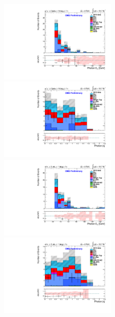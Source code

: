 \begin{figure}
\includegraphics[width=0.5\textwidth]{Plots/ControlPlots/TTbarPhotonAnalysis/MuMu/Photons/SignalPhotons/Photon_ET_splitTTbar_ratio.pdf}
\includegraphics[width=0.5\textwidth]{Plots/ControlPlots/TTbarPhotonAnalysis/MuMu/Photons/SignalPhotons/Photon_AbsEta_splitTTbar_ratio.pdf} \\
\includegraphics[width=0.5\textwidth]{Plots/ControlPlots/TTbarPhotonAnalysis/EE/Photons/SignalPhotons/Photon_ET_splitTTbar_ratio.pdf}
\includegraphics[width=0.5\textwidth]{Plots/ControlPlots/TTbarPhotonAnalysis/EE/Photons/SignalPhotons/Photon_AbsEta_splitTTbar_ratio.pdf} \\

\end{figure}
